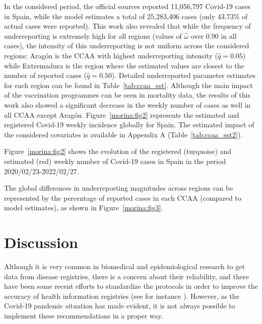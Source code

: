 \documentclass{bmcart}
\begin{document}
In the considered period, the official sources reported 11,056,797 Covid-19 cases in Spain, while the model estimates a total of 25,283,406 cases (only 43.73\% of actual cases were reported). This work also revealed that while the frequency of underreporting is extremely high for all regions (values of $\hat{\omega}$ over 0.90 in all cases), the intensity of this underreporting is not uniform across the considered regions: Arag\'on is the CCAA with highest underreporting intensity ($\hat{q}=0.05$) while Extremadura is the region where the estimated values are closest to the number of reported cases ($\hat{q}=0.50$). Detailed underreported parameter estimates for each region can be found in Table~\ref{tab:ccaa_est}. Although the main impact of the vaccination programmes can be seen in mortality data, the results of this work also showed a significant decrease in the weekly number of cases as well in all CCAA except Arag\'on. Figure~\ref{morina:fig2} represents the estimated and registered Covid-19 weekly incidence globally for Spain. The estimated impact of the considered covariates is available in Appendix A (Table~\ref{tab:ccaa_est2}).


Figure~\ref{morina:fig2} shows the evolution of the registered (turquoise) and estimated (red) weekly number of Covid-19 cases in Spain in the period 2020/02/23-2022/02/27.


The global differences in underreporting magnitudes across regions can be represented by the percentage of reported cases in each CCAA (compared to model estimates), as shown in Figure~\ref{morina:fig3}.


\section*{Discussion}\label{discussion}
Although it is very common in biomedical and epidemiological research to get data from disease registries, there is a concern about their reliability, and there have been some recent efforts to standardize the protocols in order to improve the accuracy of health information registries (see for instance \cite{Kodra2018,Harkener2019}). However, as the Covid-19 pandemic situation has made evident, it is not always possible to implement these recommendations in a proper way. 
\end{document}
